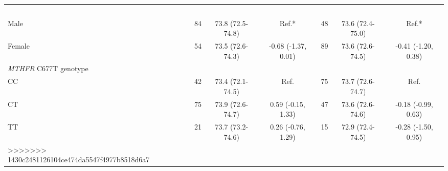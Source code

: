 \begin{flushleft}
\begin{table}
\begin{adjustbox}{width=\textwidth}
\begin{tabular}{lcccccc}
\begin{tabular}{lcccccc}
=======
 \hline 
 \multicolumn{1}{l}{Sex} &~ &~ &~ &~ &~ &~\\ 
 \quad Male & 84 & 73.8 (72.5-74.8) & Ref.* & 48 & 73.6 (72.4-75.0) & Ref.*\\ 
 Female & 54 & 73.5 (72.6-74.3) & -0.68 (-1.37, 0.01) & 89 & 73.6 (72.6-74.5) & {}-0.41 (-1.20, 0.38)\\
 \hline 
 {\textit{MTHFR}}{ C677T genotype}&~ &~ &~ &~ &~ &~\\ 
 CC & 42 & 73.4 (72.1-74.5) & Ref. & 75 & 73.7 (72.6-74.7) & Ref.\\ 
 CT & 75 & 73.9 (72.6-74.7) & 0.59 (-0.15, 1.33) & 47 & 73.6 (72.6-74.6) & {}-0.18 (-0.99, 0.63)\\ 
 TT & 21 & 73.7 (73.2-74.6) & 0.26 (-0.76, 1.29) & 15 & 72.9 (72.4-74.5) & {}-0.28 (-1.50, 0.95)\\
>>>>>>> 1430c2481126104ce474da5547f4977b8518d6a7
 \hline 
\end{tabular}
\end{adjustbox}
\end{table}
\end{flushleft}



